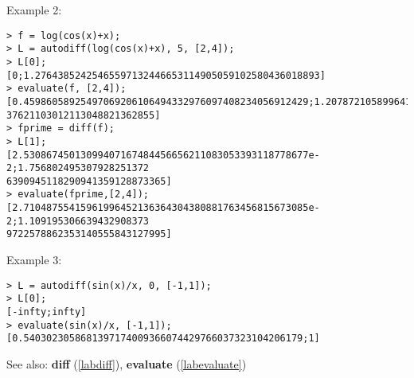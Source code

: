 \noindent Example 2: 
\begin{center}\begin{minipage}{15cm}\begin{Verbatim}[frame=single,commandchars=\\\|\~]
> f = log(cos(x)+x);
> L = autodiff(log(cos(x)+x), 5, [2,4]);
> L[0];
[0;1.27643852425465597132446653114905059102580436018893]
> evaluate(f, [2,4]);
[0.45986058925497069206106494332976097408234056912429;1.207872105899641695959010
37621103012113048821362855]
> fprime = diff(f);
> L[1];
[2.53086745013099407167484456656211083053393118778677e-2;1.756802495307928251372
6390945118290941359128873365]
> evaluate(fprime,[2,4]);
[2.71048755415961996452136364304380881763456815673085e-2;1.109195306639432908373
9722578862353140555843127995]
\end{Verbatim}
\end{minipage}\end{center}
\noindent Example 3: 
\begin{center}\begin{minipage}{15cm}\begin{Verbatim}[frame=single,commandchars=\\\|\~]
> L = autodiff(sin(x)/x, 0, [-1,1]);
> L[0];
[-infty;infty]
> evaluate(sin(x)/x, [-1,1]);
[0.5403023058681397174009366074429766037323104206179;1]
\end{Verbatim}
\end{minipage}\end{center}
See also: \textbf{diff} (\ref{labdiff}), \textbf{evaluate} (\ref{labevaluate})
